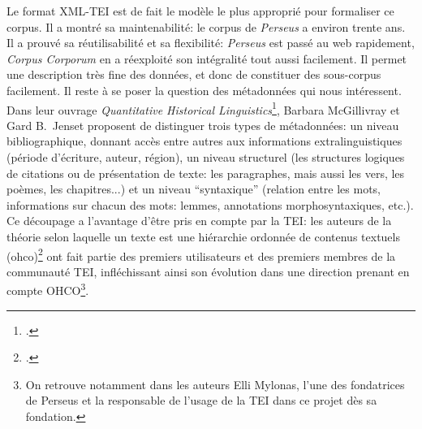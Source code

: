 Le format XML-TEI est de fait le modèle le plus approprié pour formaliser ce corpus. Il a montré sa maintenabilité: le corpus de \textit{Perseus} a environ trente ans. Il a prouvé sa réutilisabilité et sa flexibilité: \textit{Perseus} est passé au web rapidement, \textit{Corpus Corporum} en a réexploité son intégralité tout aussi facilement. Il permet une description très fine des données, et donc de constituer des sous-corpus facilement. Il reste à se poser la question des métadonnées qui nous intéressent. Dans leur ouvrage \textit{Quantitative Historical Linguistics}\footcite{gillivray_quantitative_2017}, Barbara McGillivray et Gard B.~Jenset proposent de distinguer trois types de métadonnées: un niveau bibliographique, donnant accès entre autres aux informations extralinguistiques (période d'écriture, auteur, région), un niveau structurel (les structures logiques de citations ou de présentation de texte: les paragraphes, mais aussi les vers, les poèmes, les chapitres...) et un niveau \enquote{syntaxique} (relation entre les mots, informations sur chacun des mots: lemmes, annotations morphosyntaxiques, etc.). Ce découpage a l'avantage d'être pris en compte par la TEI: les auteurs de la théorie selon laquelle un texte est une hiérarchie ordonnée de contenus textuels (\acrshort{ohco})\footcite{derose_what_1990} ont fait partie des premiers utilisateurs et des premiers membres de la communauté TEI, infléchissant ainsi son évolution dans une direction prenant en compte OHCO\footnote{On retrouve notamment dans les auteurs Elli Mylonas, l'une des fondatrices de Perseus et la responsable de l'usage de la TEI dans ce projet dès sa fondation.}.

